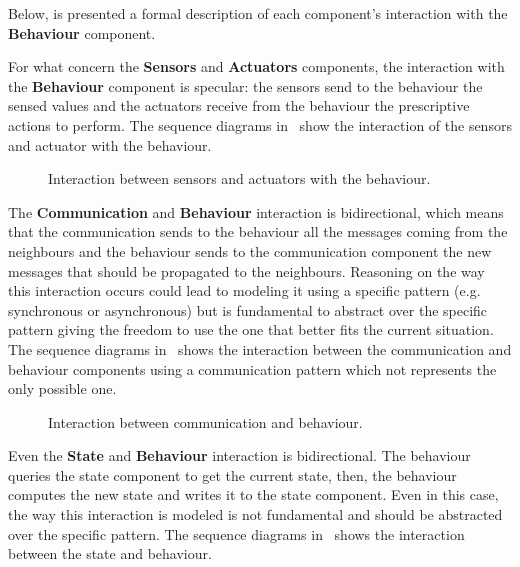 Below, is presented a formal description of each component's interaction with the \textbf{Behaviour} component.

For what concern the \textbf{Sensors} and \textbf{Actuators} components, the interaction with the \textbf{Behaviour} component is specular: the
sensors send to the behaviour the sensed values and the actuators receive from the behaviour the prescriptive actions to perform.
The sequence diagrams in~ show the interaction of the sensors and actuator with the
behaviour.

\begin{figure}
	\centering
	\caption{Interaction between sensors and actuators with the behaviour.}
	\label{fig:framework-components-interaction-2-sensors-actuators}
\end{figure}

The \textbf{Communication} and \textbf{Behaviour} interaction is bidirectional, which means that the communication sends to the behaviour all the
messages coming from the neighbours and the behaviour sends to the communication component the new messages that should be propagated
to the neighbours.
Reasoning on the way this interaction occurs could lead to modeling it using a specific pattern (e.g. synchronous or asynchronous) but is fundamental
to abstract over the specific pattern giving the freedom to use the one that better fits the current situation.
The sequence diagrams in~ shows the interaction between the communication and
behaviour components using a communication pattern which not represents the only possible one.

\begin{figure}
	\centering
	\caption{Interaction between communication and behaviour.}
	\label{fig:framework-components-interaction-2-communication-behaviour}
\end{figure}

Even the \textbf{State} and \textbf{Behaviour} interaction is bidirectional.
The behaviour queries the state component to get the current state, then, the behaviour computes the new state and writes it to the state component.
Even in this case, the way this interaction is modeled is not fundamental and should be abstracted over the specific pattern.
The sequence diagrams in~ shows the interaction between the state and behaviour.

